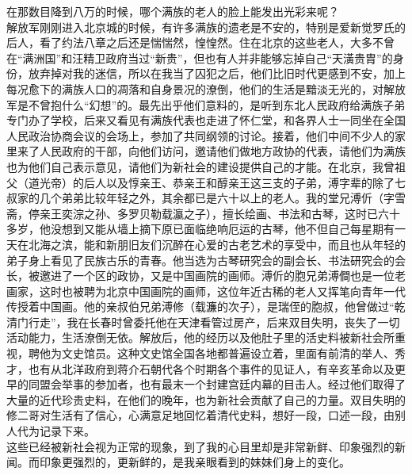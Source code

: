 在那数目降到八万的时候，哪个满族的老人的脸上能发出光彩来呢？\\

解放军刚刚进入北京城的时候，有许多满族的遗老是不安的，特别是爱新觉罗氏的后人，看了约法八章之后还是惴惴然，惶惶然。住在北京的这些老人，大多不曾在“满洲国”和汪精卫政府当过“新贵”，但也有人并非能够忘掉自己“天潢贵胄”的身份，放弃掉对我的迷信，所以在我当了囚犯之后，他们比旧时代更感到不安，加上每况愈下的满族人口的凋落和自身景况的潦倒，他们的生活是黯淡无光的，对解放军是不曾抱什么“幻想”的。最先出乎他们意料的，是听到东北人民政府给满族子弟专门办了学校，后来又看见有满族代表也走进了怀仁堂，和各界人士一同坐在全国人民政治协商会议的会场上，参加了共同纲领的讨论。接着，他们中间不少人的家里来了人民政府的干部，向他们访问，邀请他们做地方政协的代表，请他们为满族也为他们自己表示意见，请他们为新社会的建设提供自己的才能。在北京，我曾祖父（道光帝）的后人以及惇亲王、恭亲王和醇亲王这三支的子弟，溥字辈的除了七叔家的几个弟弟比较年轻之外，其余都已是六十以上的老人。我的堂兄溥伒（字雪斋，停亲王奕淙之孙、多罗贝勒载瀛之子），擅长绘画、书法和古琴，这时已六十多岁，他没想到又能从墙上摘下原已面临绝响厄运的古琴，他不但自己每星期有一天在北海之滨，能和新朋旧友们沉醉在心爱的古老艺术的享受中，而且也从年轻的弟子身上看见了民族古乐的青春。他当选为古琴研究会的副会长、书法研究会的会长，被邀进了一个区的政协，又是中国画院的画师。溥伒的胞兄弟溥僴也是一位老画家，这时也被聘为北京中国画院的画师，这位年近古稀的老人又挥笔向青年一代传授着中国画。他的亲叔伯兄弟溥修（载濂的次子），是瑞侄的胞叔，他曾做过“乾清门行走”，我在长春时曾委托他在天津看管过房产，后来双目失明，丧失了一切活动能力，生活潦倒无依。解放后，他的经历以及他肚子里的活史料被新社会所重视，聘他为文史馆员。这种文史馆全国各地都普遍设立着，里面有前清的举人、秀才，也有从北洋政府到蒋介石朝代各个时期各个事件的见证人，有辛亥革命以及更早的同盟会举事的参加者，也有最末一个封建宫廷内幕的目击人。经过他们取得了大量的近代珍贵史料，在他们的晚年，也为新社会贡献了自己的力量。双目失明的修二哥对生活有了信心，心满意足地回忆着清代史料，想好一段，口述一段，由别人代为记录下来。\\

这些已经被新社会视为正常的现象，到了我的心目里却是非常新鲜、印象强烈的新闻。而印象更强烈的，更新鲜的，是我亲眼看到的妹妹们身上的变化。\\

